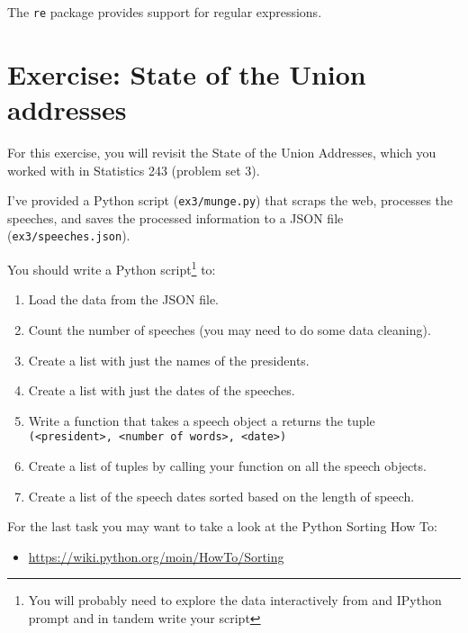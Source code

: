 The \texttt{re} package provides support for regular expressions.

\section{Exercise: State of the Union addresses}

For this exercise, you will revisit the State of the Union Addresses, which you
worked with in Statistics 243 (problem set 3).

I've provided a Python script (\texttt{ex3/munge.py}) that scraps the web,
processes the speeches, and saves the processed information to a JSON file
(\texttt{ex3/speeches.json}).

You should write a Python script\footnote{You will probably need to explore the
data interactively from and IPython prompt and in tandem write your script} to:
\begin{enumerate}
\item Load the data from the JSON file.
\item Count the number of speeches (you may need to do some data cleaning).
\item Create a list with just the names of the presidents.
\item Create a list with just the dates of the speeches.
\item Write a function that takes a speech object a returns the tuple
  \texttt{(<president>, <number of words>, <date>)}
\item Create a list of tuples by calling your function on all the speech objects.
\item Create a list of the speech dates sorted based on the length of speech.
\end{enumerate}

For the last task you may want to take a look at the Python Sorting How To:
\begin{itemize}
\item \url{https://wiki.python.org/moin/HowTo/Sorting}
\end{itemize}
